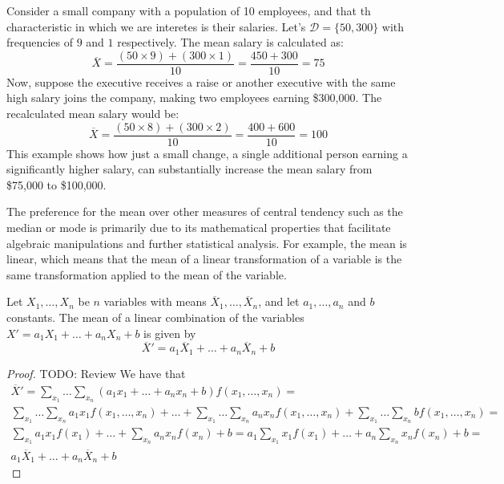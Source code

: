 \begin{example}
Consider a small company with a population of 10 employees, and that th characteristic in which we are interetes is their salaries. Let's $\mathcal{D} = \{50, 300\}$ with  frequencies of $9$ and $1$ respectively. The mean salary is calculated as:
\[ 
\overline{X} = \frac{(50 \times 9) + (300 \times 1)}{10} = \frac{450 + 300}{10} = 75
\]
Now, suppose the executive receives a raise or another executive with the same high salary joins the company, making two employees earning \$300,000. The recalculated mean salary would be:
\[
\overline{X} = \frac{(50 \times 8) + (300 \times 2)}{10} = \frac{400 + 600}{10} = 100
\]
This example shows how just a small change, a single additional person earning a significantly higher salary, can substantially increase the mean salary from \$75,000 to \$100,000.
\end{example}

The preference for the mean over other measures of central tendency such as the median or mode is primarily due to its mathematical properties that facilitate algebraic manipulations and further statistical analysis. For example, the mean is linear, which means that the mean of a linear transformation of a variable is the same transformation applied to the mean of the variable.

\begin{proposition}
Let $X_1, \ldots, X_n$ be $n$ variables with means $\overline{X}_1, \ldots, \overline{X}_n$, and let $a_1, \ldots, a_n$ and $b$ constants. The mean of a linear combination of the variables $X' = a_1 X_1 + \ldots + a_n X_n + b$ is given by
\[
\overline{X}' = a_1 \overline{X}_1 + \ldots + a_n \overline{X}_n + b
\]
\end{proposition}
\begin{proof}
{\color{red} TODO: Review}
We have that
\begin{multline}
\overline{X}' = \sum_{x_1} \ldots \sum_{x_n} \left(a_ 1 x_1 + \ldots + a_n x_n + b  \right) f\left(x_1, \ldots, x_n \right) = \\
\sum_{x_1} \ldots \sum_{x_n} a_1 x_1 f\left(x_1, \ldots, x_n \right) + \ldots + \sum_{x_1} \ldots \sum_{x_n} a_n x_n f\left(x_1, \ldots, x_n \right) + \sum_{x_1} \ldots \sum_{x_n} b f\left(x_1, \ldots, x_n \right) = \\
\sum_{x_1} a_1 x_1 f\left(x_1\right) + \ldots + \sum_{x_n} a_n x_n f\left( x_n \right) + b = 
a_1 \sum_{x_1} x_1 f\left(x_1\right) + \ldots + a_n \sum_{x_n} x_n f\left( x_n \right) + b = \\
a_1 \overline{X}_1 + \ldots + a_n \overline{X}_n + b
\end{multline}
\end{proof}

